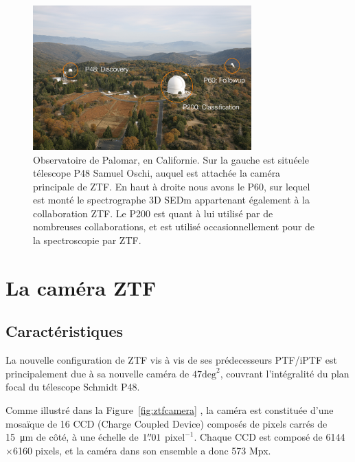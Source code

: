 \documentclass[../main/main.tex]{subfiles}
\begin{document}
\begin{figure}[h]
  \centering
  \includegraphics[width=0.75\textwidth]{../figures/02_ztf/palomar_obs-min.png}
  \caption[Observatoire de Palomar]{Observatoire de Palomar, en Californie. Sur la gauche est
    situéele télescope P48 Samuel
    Oschi, auquel est attachée la caméra principale de ZTF. En haut à droite nous avons le P60, sur lequel est monté le
    spectrographe 3D SEDm appartenant également à la collaboration
    ZTF. Le P200 est quant à lui utilisé par de nombreuses
    collaborations, et est utilisé occasionnellement pour de la
    spectroscopie par ZTF.}
\label{fig:palomar_obs}
\end{figure}

\section{La caméra ZTF}
\label{sec:ztfcamera}

\subsection{Caractéristiques}

La nouvelle configuration de ZTF vis à vis de ses prédecesseurs PTF/iPTF
est principalement due à sa nouvelle caméra de $47\text{deg}^{2}$, couvrant
l'intégralité du plan focal du télescope Schmidt P48.

Comme illustré dans la Figure~\ref{fig:ztfcamera} \citep{BellmZTF2019}, la caméra est
constituée d'une mosaïque de 16 CCD (Charge Coupled Device) composés de
pixels carrés de \SI{15}{\micro\metre} de côté, à une échelle de $1\overset{\prime\prime}{.}01$
$\text{pixel}^{-1}$. Chaque CCD est composé de 6144$\times$6160 pixels,
et la caméra dans son ensemble a donc 573 Mpx. 
\end{document}
